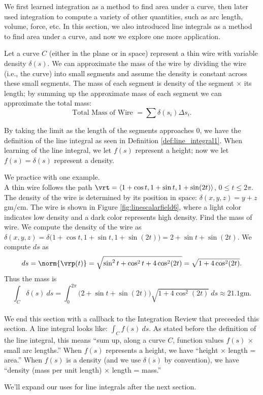 We first learned integration as a method to find area under a curve, then later used integration to compute a variety of other quantities, such as arc length, volume, force, etc. In this section, we also introduced line integrals as a method to find area under a curve, and now we explore one more application.

Let a curve $C$ (either in the plane or in space) represent a thin wire with variable density $\delta(s)$. We can approximate the mass of the wire by dividing the wire (i.e., the curve) into small segments and assume the density is constant across these small segments. The mass of each segment is density of the segment $\times$ its length; by summing up the approximate mass of each segment we can approximate the total mass:
$$\text{Total Mass of Wire } = \sum \delta(s_i)\Delta s_i.$$

By taking the limit as the length of the segments approaches 0, we have the definition of the line integral as seen in Definition \ref{def:line_integral1}. When learning of the line integral, we let $f(s)$ represent a height; now we let $f(s) = \delta(s)$ represent a density.

We practice with one example.\\

{A thin wire follows the path $\vrt = \langle 1+\cos t,1+\sin t, 1+ \sin(2t)\rangle$, $0\leq t\leq 2\pi$. The density of the wire is determined by its position in space: $\delta(x,y,z) = y+z$ gm/cm. The wire is shown in Figure \ref{fig:linescalarfield6}, where a light color indicates low density and a dark color represents high density. Find the mass of wire.
}
{We compute the density of the wire as $\delta(x,y,z) = \delta\big(1+\cos t,1+\sin t, 1+\sin(2t)\big) = 2+\sin t+\sin(2t)$. We compute $ds$ as
$$ds = \norm{\vrp(t)} = \sqrt{\sin^2t+\cos^2t+4\cos^2(2t)} = \sqrt{1+4\cos^2(2t)}.$$
Thus the mass is
$$\int_C \delta(s)\ ds = \int_0^{2\pi} \big(2+\sin t+\sin(2t)\big)\sqrt{1+4\cos^2(2t)}\ ds \approx 21.1\text{gm}. $$
}\\

We end this section with a callback to the Integration Review that preceeded this section. A line integral looks like: $\int_C f(s)\ ds$. As stated before the definition of the line integral, this means ``sum up, along a curve $C$, function values $f(s)$ $\times$ small arc lengths.'' When $f(s)$ represents a height, we have ``height $\times$ length = area.'' When $f(s)$ is a density (and we use $\delta(s)$ by convention), we have ``density (mass per unit length) $\times$ length = mass.''

We'll expand our uses for line integrals after the next section. 
